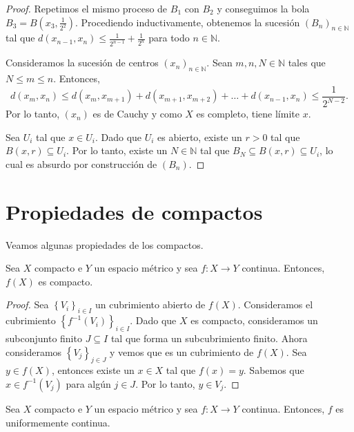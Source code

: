\begin{proof}
	Repetimos el mismo proceso de $B_1$ con $B_2$ y conseguimos la bola $B_3 = B(x_3, \frac{1}{2^2})$. Procediendo inductivamente, obtenemos la sucesión $(B_n)_{n \in \mathbb{N}}$ tal que $d(x_{n-1}, x_{n}) \leq \frac{1}{2^{n-1}} + \frac{1}{2^n}$ para todo $n \in \mathbb{N}$.

	\begin{center}
		
	\end{center}

	Consideramos la sucesión de centros $(x_n)_{n \in \mathbb{N}}$. Sean $m, n, N \in \mathbb{N}$ tales que $N \leq m \leq n$. Entonces,
	\begin{equation*}
		d(x_m, x_n) \leq d(x_m, x_{m+1}) + d(x_{m+1}, x_{m+2}) + \dots + d(x_{n-1}, x_n) \leq \frac{1}{2^{N-2}}.
	\end{equation*}
	Por lo tanto, $(x_n)$ es de Cauchy y como $X$ es completo, tiene límite $x$.

	Sea $U_i$ tal que $x \in U_i$. Dado que $U_i$ es abierto, existe un $r > 0$ tal que $B(x, r) \subseteq U_i$. Por lo tanto, existe un $N \in \mathbb{N}$ tal que $B_{N} \subseteq B(x, r) \subseteq U_i$, lo cual es absurdo por construcción de $(B_n)$.
\end{proof}

\section{Propiedades de compactos}

Veamos algunas propiedades de los compactos.

\begin{proposition}
	Sea $X$ compacto e $Y$ un espacio métrico y sea $f : X \to Y$ continua. Entonces, $f(X)$ es compacto.
\end{proposition}

\begin{proof}
	Sea $\left\{ V_i \right\}_{i \in I}$ un cubrimiento abierto de $f(X)$. Consideramos el cubrimiento $\left\{ f^{-1}(V_i) \right\}_{i \in I}$. Dado que $X$ es compacto, consideramos un subconjunto finito $J \subseteq I $ tal que forma un subcubrimiento finito. Ahora consideramos $\left\{ V_j \right\}_{j \in J}$ y vemos que es un cubrimiento de $f(X)$. Sea $y \in f(X)$, entonces existe un $x \in X$ tal que $f(x) = y$. Sabemos que $x \in f^{-1}(V_j)$ para algún $j \in J$. Por lo tanto, $y \in V_j$.
\end{proof}

\begin{proposition}
	Sea $X$ compacto e $Y$ un espacio métrico y sea $f : X \to Y$ continua. Entonces, $f$ es uniformemente continua.
\end{proposition}

